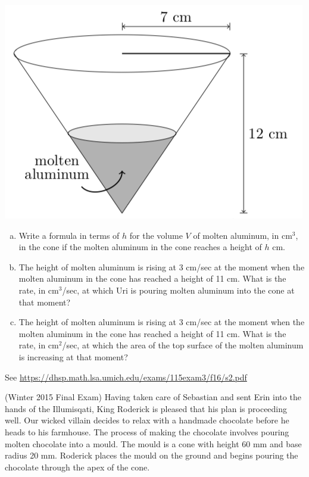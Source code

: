 \documentclass[11pt]{exam}
\begin{document}
\begin{questions}
\begin{center}
  \includegraphics[scale=0.4]{aluminium.png}
\end{center}
\begin{enumerate}[(a)]
\item Write a formula in terms of $h$ for the volume $V$ of molten aluminum, in cm$^3$, in the cone if the molten aluminum in the cone reaches a height of $h$ cm.
\item The height of molten aluminum is rising at 3 cm/sec at the moment when the molten aluminum in the cone has reached a height of 11 cm. What is the rate, in cm$^3$/sec, at which Uri is pouring molten aluminum into the cone at that moment?
\item The height of molten aluminum is rising at 3 cm/sec at the moment when the molten aluminum in the cone has reached a height of 11 cm. What is the rate, in cm$^2$/sec, at which the area of the top surface of the molten aluminum is increasing at that moment?
\end{enumerate}
\begin{solution}
  See \href{https://dhsp.math.lsa.umich.edu/exams/115exam3/f16/s2.pdf}{https://dhsp.math.lsa.umich.edu/exams/115exam3/f16/s2.pdf}
\end{solution}
\pagebreak
\question (Winter 2015 Final Exam) %
Having taken care of Sebastian and sent Erin into the hands of the Illumisqati, King Roderick is pleased that his plan is proceeding well. Our wicked villain decides to relax with a handmade chocolate before he heads to his farmhouse. The process of making the chocolate involves pouring molten chocolate into a mould. The mould is a cone with height 60 mm and base radius 20 mm. Roderick places the mould on the ground and begins pouring the chocolate through the apex of the cone.

\end{questions}
\end{document}
